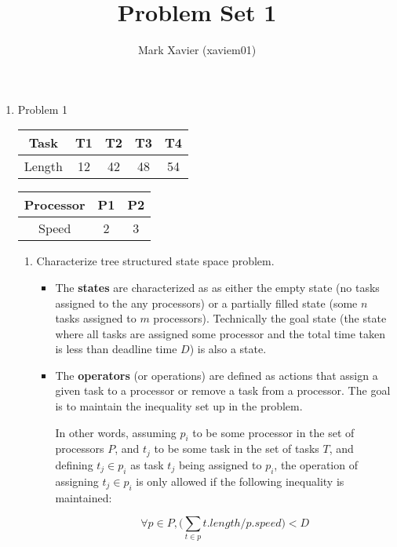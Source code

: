 \documentclass{article}
\title{Problem Set 1}
\author{Mark Xavier (xaviem01)}
\begin{document}
	\maketitle
	
	\begin{enumerate}
		\item Problem 1
		
			\begin{center}
				\begin{tabular}{|c|c|c|c|c|}
					\hline
					Task & T1 & T2 & T3 & T4 \\
					\hline
					Length & 12 & 42 & 48 & 54 \\
					\hline
				\end{tabular}
			
				\begin{tabular}{|c|c|c|}
					\hline
					Processor & P1 & P2 \\
					\hline
					Speed & 2 & 3 \\
					\hline
				\end{tabular}
			\end{center}
		
			\begin{enumerate}
				\item Characterize tree structured state space problem.
				
				\begin{itemize}
					\item The \textbf{states} are characterized as as either the empty state (no tasks assigned to the any processors) or a partially filled state (some $n$ tasks assigned to $m$ processors).  Technically the goal state (the state where all tasks are assigned some processor and the total time taken is less than deadline time $D$) is also a state. 
					
					\item The \textbf{operators} (or operations) are defined as actions that assign a given task to a processor or remove a task from a processor.  The goal is to maintain the inequality set up in the problem.
					
					In other words, assuming $p_i$ to be some processor in the set of processors $P$, and $t_j$ to be some task in the set of tasks $T$, and defining $t_j \in p_i$ as task $t_j$ being assigned to $p_i$, the operation of assigning $t_j \in p_i$ is only allowed if the following inequality is maintained:
					
					$$\forall p \in P, \bigg(\sum_{t \in p}t.length/p.speed\bigg) < D$$
					

\end{itemize}
\end{enumerate}
\end{enumerate}
\end{document}
